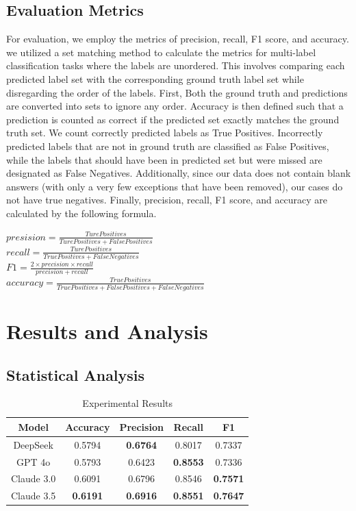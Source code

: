 \documentclass[a4paper]{article}
\begin{document}
\subsection{Evaluation Metrics}
For evaluation, we employ the metrics of precision, recall, F1 score, and accuracy. we utilized a set matching method to calculate the metrics 
for multi-label classification tasks where the labels are unordered. 
This involves comparing each predicted label set with the corresponding ground truth label set while disregarding the order of the labels. 
First, Both the ground truth and predictions are converted into sets to ignore any order. Accuracy is then defined such that a prediction is 
counted as correct if the predicted set exactly matches the ground truth set. We count correctly predicted labels as True Positives. 
Incorrectly predicted labels that are not in ground truth are classified as False Positives, while the labels that should have been in predicted set 
but were missed are designated as False Negatives. Additionally, since our data does not contain blank answers (with only a very few exceptions that have been removed), 
our cases do not have true negatives. Finally, precision, recall, F1 score, and accuracy are calculated by the following formula.
\begin{center}
$presision=\frac{Ture Positives}{Ture Positives + False Positives}$\\ [0.3 cm]
$recall=\frac{Ture Positives}{True Positives + False Negatives}$\\ [0.3 cm]
$F1=\frac{2 \times precision \times recall}{precision + recall}$\\ [0.3 cm]
$accuracy=\frac{True Positives}{True Positives + False Positives + False Negatives}$
\end{center}

\section{Results and Analysis}
\subsection{Statistical Analysis}

\begin{table}[ht]
    \begin{center}
    \caption{Experimental Results}
    
    
    \begin{tabular}{|c|c|c|c|c|}
    \hline
    \textbf{Model} & \textbf{Accuracy} & \textbf{Precision} & \textbf{Recall} & \textbf{F1} \\ \hline
    DeepSeek & 0.5794 & \textbf{0.6764} & 0.8017 & 0.7337 \\ 
    GPT 4o & 0.5793 & 0.6423 & \textbf{0.8553} & 0.7336 \\
    Claude 3.0 & 0.6091	& 0.6796 & 0.8546 & \textbf{0.7571} \\
    Claude 3.5 & \textbf{0.6191} & \textbf{0.6916} & \textbf{0.8551} & \textbf{0.7647} \\ \hline
    \end{tabular}
    \end{center}
    \end{table}
    
\end{document}
